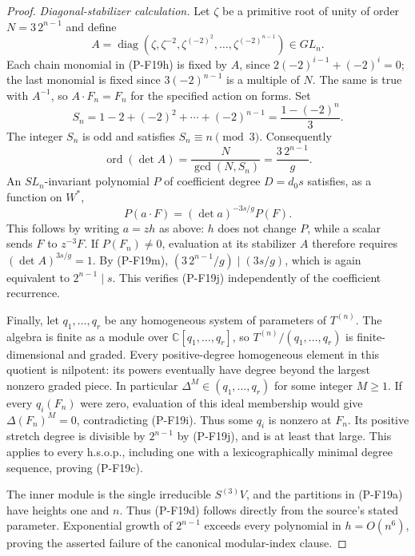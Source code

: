 \begin{proof}
\emph{Diagonal-stabilizer calculation.}
Let $\zeta$ be a primitive root of unity of order $N=3\,2^{n-1}$
and define
\[
 A=\operatorname{diag}
  (\zeta,\zeta^{-2},\zeta^{(-2)^2},\ldots,
                         \zeta^{(-2)^{n-1}})\in GL_n.
\]
Each chain monomial in (P-F19h) is fixed by $A$, since
$2(-2)^{i-1}+(-2)^i=0$; the last monomial is fixed since
$3(-2)^{n-1}$ is a multiple of $N$. The same is true with
$A^{-1}$, so $A\cdot F_n=F_n$ for the specified action on forms.
Set
\[
 S_n=1-2+(-2)^2+\cdots+(-2)^{n-1}
     =\frac{1-(-2)^n}{3}.
\]
The integer $S_n$ is odd and satisfies $S_n\equiv n\pmod3$.
Consequently
\[
 \operatorname{ord}(\det A)
 =\frac{N}{\gcd(N,S_n)}
 =\frac{3\,2^{n-1}}{g}.
 \tag{P-F19m}
\]
An $SL_n$-invariant polynomial $P$ of coefficient degree
$D=d_0s$ satisfies, as a function on $W^*$,
\[
 P(a\cdot F)=(\det a)^{-3s/g}P(F).
 \tag{P-F19n}
\]
This follows by writing $a=zh$ as above: $h$ does not change
$P$, while a scalar sends $F$ to $z^{-3}F$.
If $P(F_n)\ne0$, evaluation at its stabilizer $A$ therefore
requires $(\det A)^{3s/g}=1$. By (P-F19m),
$(3\,2^{n-1}/g)\mid(3s/g)$, which is again equivalent to
$2^{n-1}\mid s$. This verifies (P-F19j) independently of
the coefficient recurrence.

Finally, let $q_1,\ldots,q_r$ be any homogeneous system of
parameters of $T^{(n)}$. The algebra is finite as a module over
$\mathbb C[q_1,\ldots,q_r]$, so
$T^{(n)}/(q_1,\ldots,q_r)$ is finite-dimensional and graded.
Every positive-degree homogeneous element in this quotient is
nilpotent: its powers eventually have degree beyond the largest
nonzero graded piece. In particular
$\Delta^M\in(q_1,\ldots,q_r)$ for some integer $M\ge1$.
If every $q_i(F_n)$ were zero, evaluation of this ideal membership
would give $\Delta(F_n)^M=0$, contradicting (P-F19i).
Thus some $q_i$ is nonzero at $F_n$. Its positive stretch degree
is divisible by $2^{n-1}$ by (P-F19j), and is at least that
large. This applies to every h.s.o.p., including one with a
lexicographically minimal degree sequence, proving (P-F19c).

The inner module is the single irreducible $S^{(3)}V$, and
the partitions in (P-F19a) have heights one and $n$.
Thus (P-F19d) follows directly from the source's stated
parameter. Exponential growth of $2^{n-1}$ exceeds every
polynomial in $h=O(n^6)$, proving the asserted failure of the
canonical modular-index clause.
\end{proof}

